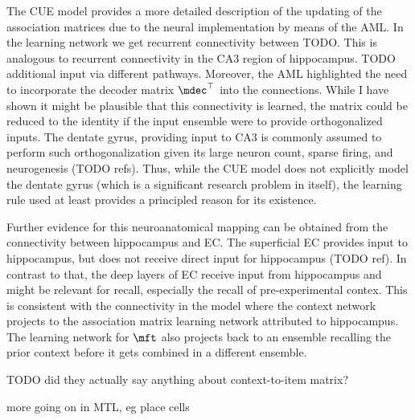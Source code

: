 The CUE model provides a more detailed description of the updating of the association matrices due to the neural implementation by means of the AML\@.
In the learning network we get recurrent connectivity between TODO\@.
This is analogous to recurrent connectivity in the CA3 region of hippocampus.
TODO additional input via different pathways.
Moreover, the AML highlighted the need to incorporate the decoder matrix $\mdec\Tr$ into the connections.
While I have shown it might be plausible that this connectivity is learned, the matrix could be reduced to the identity if the input ensemble were to provide orthogonalized inputs.
The dentate gyrus, providing input to CA3 is commonly assumed to perform such orthogonalization given its large neuron count, sparse firing, and neurogenesis (TODO refs).
Thus, while the CUE model does not explicitly model the dentate gyrus (which is a significant research problem in itself), the learning rule used at least provides a principled reason for its existence.

Further evidence for this neuroanatomical mapping can be obtained from the connectivity between hippocampus and EC\@.
The superficial EC provides input to hippocampus, but does not receive direct input for hippocampus (TODO ref).
In contrast to that, the deep layers of EC receive input from hippocampus and might be relevant for recall, especially the recall of pre-experimental contex.
This is consistent with the connectivity in the model where the context network projects to the association matrix learning network attributed to hippocampus.
The learning network for $\mft$ also projects back to an ensemble recalling the prior context before it gets combined in a different ensemble.


TODO did they actually say anything about context-to-item matrix?

more going on in MTL, eg place cells


